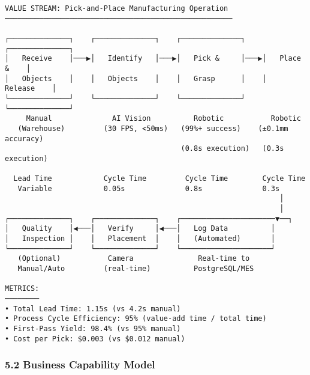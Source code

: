 \documentclass[
]{article}
\begin{document}
\begin{verbatim}
VALUE STREAM: Pick-and-Place Manufacturing Operation
─────────────────────────────────────────────────────

┌──────────────┐    ┌──────────────┐    ┌──────────────┐    ┌──────────────┐
│   Receive    │───▶│   Identify   │───▶│   Pick &     │───▶│   Place &    │
│   Objects    │    │   Objects    │    │   Grasp      │    │   Release    │
└──────────────┘    └──────────────┘    └──────────────┘    └──────────────┘
     Manual              AI Vision          Robotic           Robotic
   (Warehouse)         (30 FPS, <50ms)   (99%+ success)    (±0.1mm accuracy)
                                         (0.8s execution)   (0.3s execution)

  Lead Time            Cycle Time         Cycle Time        Cycle Time
   Variable            0.05s              0.8s              0.3s
                                                                │
                                                                │
┌──────────────┐    ┌──────────────┐    ┌──────────────────────▼──┐
│   Quality    │◀───│   Verify     │◀───│   Log Data          │
│   Inspection │    │   Placement  │    │   (Automated)       │
└──────────────┘    └──────────────┘    └─────────────────────┘
   (Optional)           Camera               Real-time to
   Manual/Auto         (real-time)          PostgreSQL/MES

METRICS:
────────
• Total Lead Time: 1.15s (vs 4.2s manual)
• Process Cycle Efficiency: 95% (value-add time / total time)
• First-Pass Yield: 98.4% (vs 95% manual)
• Cost per Pick: $0.003 (vs $0.012 manual)
\end{verbatim}

\hypertarget{business-capability-model}{%
\subsubsection{5.2 Business Capability
Model}\label{business-capability-model}}
\end{document}
